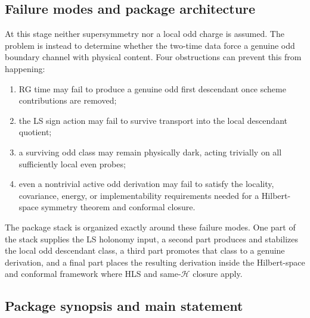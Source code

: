 \documentclass[
  aps,
  prd,
  onecolumn,
  notitlepage,
  nofootinbib,
  superscriptaddress,
  10pt
]{revtex4-2}
\theoremstyle{definition}
\theoremstyle{plain}
\begin{document}
\subsection{Failure modes and package architecture}
\label{subsec:failure-modes-main}

At this stage neither supersymmetry nor a local odd charge is assumed.  The
problem is instead to determine whether the two-time data force a genuine odd
boundary channel with physical content.  Four obstructions can prevent this
from happening:
\begin{enumerate}[label=\textnormal{(\roman*)},leftmargin=*,itemsep=0.25em]
  \item RG time may fail to produce a genuine odd first descendant once
  scheme contributions are removed;
  \item the LS sign action may fail to survive transport into the
  local descendant quotient;
  \item a surviving odd class may remain physically dark, acting trivially on
  all sufficiently local even probes;
  \item even a nontrivial active odd derivation may fail to satisfy the
  locality, covariance, energy, or implementability requirements needed for a
  Hilbert-space symmetry theorem and conformal closure.
\end{enumerate}
The package stack is organized exactly around these failure modes.  One part of
the stack supplies the LS holonomy input, a second part produces and stabilizes the local odd
descendant class, a third part promotes that class to a genuine derivation, and
a final part places the resulting derivation inside the Hilbert-space and
conformal framework where HLS and same-\(\mathcal H\) closure apply.

\subsection{Package synopsis and main statement}
\label{subsec:assumptions-main}
\end{document}
